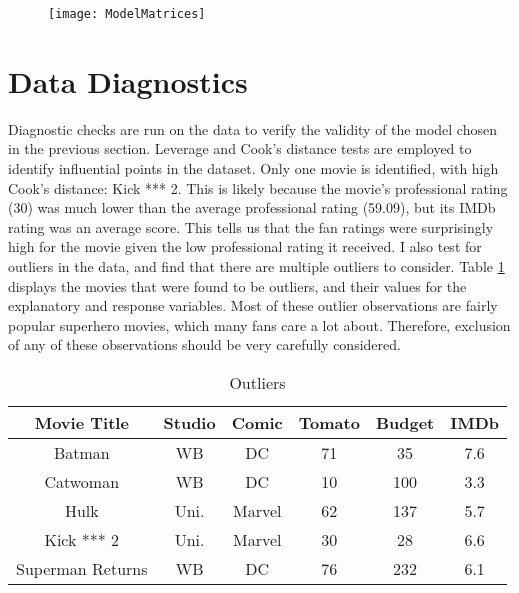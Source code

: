 \documentclass{svproc}
\begin{document}
\begin{figure}
\begin{center}
\texttt{[image: ModelMatrices]}
\label{mm}
\smallskip
\end{center}
\end{figure}

\section{Data Diagnostics}

Diagnostic checks are run on the data to verify the validity of the model chosen in the previous section. Leverage and Cook's distance tests are employed to identify influential points in the dataset. Only one movie is identified, with high Cook's distance: Kick *** 2. This is likely because the movie's professional rating (30) was much lower than the average professional rating (59.09), but its IMDb rating was an average score. This tells us that the fan ratings were surprisingly high for the movie given the low professional rating it received. I also test for outliers in the data, and find that there are multiple outliers to consider. Table \ref{tb:outliers} displays the movies that were found to be outliers, and their values for the explanatory and response variables. Most of these outlier observations are fairly popular superhero movies, which many fans care a lot about. Therefore, exclusion of any of these observations should be very carefully considered.

\begin{table}[H]
\caption{Outliers}
\fontsize{8}{10}\selectfont
\begin{center}
\begin{tabular}{c|c|c|c|c|c}
\hline 
\textbf{ Movie Title } & \textbf{ Studio } & \textbf{ Comic } & \textbf{ Tomato } & \textbf{ Budget } & \textbf{ IMDb } \\
\hline
Batman & WB & DC & 71 & 35 & 7.6 \\
Catwoman &  WB & DC & 10 & 100 & 3.3 \\
Hulk &  Uni. & Marvel & 62 & 137 & 5.7 \\
Kick *** 2 &  Uni. & Marvel & 30 &  28 & 6.6 \\
Superman Returns & WB & DC & 76 & 232 & 6.1 \\
\hline
\end{tabular}
\end{center}
\label{tb:outliers}
\end{table}
\end{document}
